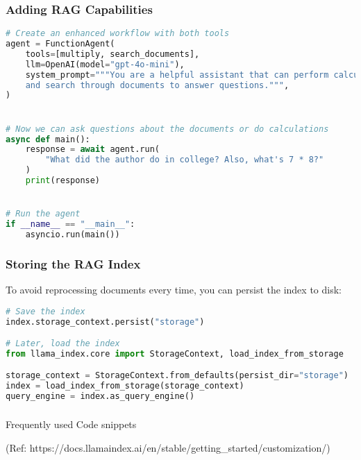 \begin{frame}[fragile]\frametitle{Adding RAG Capabilities}

\begin{lstlisting}[language=Python]
# Create an enhanced workflow with both tools
agent = FunctionAgent(
    tools=[multiply, search_documents],
    llm=OpenAI(model="gpt-4o-mini"),
    system_prompt="""You are a helpful assistant that can perform calculations
    and search through documents to answer questions.""",
)


# Now we can ask questions about the documents or do calculations
async def main():
    response = await agent.run(
        "What did the author do in college? Also, what's 7 * 8?"
    )
    print(response)


# Run the agent
if __name__ == "__main__":
    asyncio.run(main())
\end{lstlisting}
\end{frame}

\begin{frame}[fragile]\frametitle{Storing the RAG Index}

To avoid reprocessing documents every time, you can persist the index to disk:


\begin{lstlisting}[language=Python]
# Save the index
index.storage_context.persist("storage")

# Later, load the index
from llama_index.core import StorageContext, load_index_from_storage

storage_context = StorageContext.from_defaults(persist_dir="storage")
index = load_index_from_storage(storage_context)
query_engine = index.as_query_engine()
\end{lstlisting}
\end{frame}

\begin{frame}[fragile]\frametitle{}
\begin{center}
{\Large Frequently used Code snippets}

{\tiny (Ref: https://docs.llamaindex.ai/en/stable/getting\_started/customization/)}

\end{center}
\end{frame}


